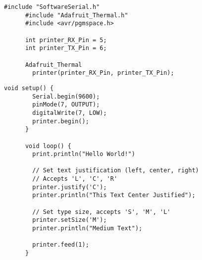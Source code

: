 \begin{minipage}[t]{0.49\tw}
  \vspace{0.0in}
  \begin{Verbatim}[gobble=3,fontsize=\small]
      #include "SoftwareSerial.h"
      #include "Adafruit_Thermal.h"
      #include <avr/pgmspace.h>

      int printer_RX_Pin = 5;
      int printer_TX_Pin = 6;

      Adafruit_Thermal
        printer(printer_RX_Pin, printer_TX_Pin);
  \end{Verbatim}
\end{minipage}
\hfill
\begin{minipage}[t]{0.49\tw}
  \vspace{0.15in}
  \begin{Verbatim}[gobble=3,fontsize=\small]
      void setup() {
        Serial.begin(9600);
        pinMode(7, OUTPUT);
        digitalWrite(7, LOW);
        printer.begin();
      }

      void loop() {
        print.println("Hello World!")

        // Set text justification (left, center, right)
        // Accepts 'L', 'C', 'R'
        printer.justify('C');
        printer.println("This Text Center Justified");

        // Set type size, accepts 'S', 'M', 'L'
        printer.setSize('M');
        printer.println("Medium Text");

        printer.feed(1);
      }
  \end{Verbatim}
\end{minipage}


